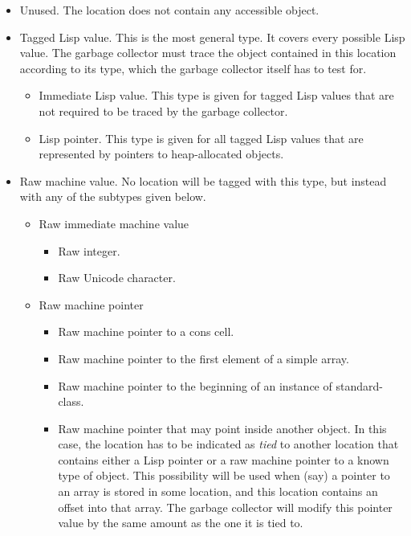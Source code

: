 \documentclass{article}
\begin{document}
\begin{itemize}
\item Unused.  The location does not contain any accessible object.
\item Tagged Lisp value.  This is the most general type.  It covers
  every possible Lisp value.  The garbage collector must trace the
  object contained in this location according to its type, which the
  garbage collector itself has to test for. 
  \begin{itemize}
  \item Immediate Lisp value.  This type is given for tagged Lisp values
    that are not required to be traced by the garbage collector. 
  \item Lisp pointer.  This type is given for all tagged Lisp values
    that are represented by pointers to heap-allocated objects.  
  \end{itemize}
\item Raw machine value.  No location will be tagged with this type,
  but instead with any of the subtypes given below.
  \begin{itemize}
  \item Raw immediate machine value
    \begin{itemize}
      \item Raw integer.
      \item Raw Unicode character.
    \end{itemize}
  \item Raw machine pointer
    \begin{itemize}
    \item Raw machine pointer to a cons cell.  
    \item Raw machine pointer to the first element of a simple array. 
    \item Raw machine pointer to the beginning of an instance of
    standard-class. 
    \item Raw machine pointer that may point inside another object.
    In this case, the location has to be indicated as \emph{tied} to
    another location that contains either a Lisp pointer or a raw
    machine pointer to a known type of object.  This possibility will
    be used when (say) a pointer to an array is stored in some
    location, and this location contains an offset into that array.
    The garbage collector will modify this pointer value by the same
    amount as the one it is tied to. 
    \end{itemize}
  \end{itemize}
\end{itemize}
\end{document}
